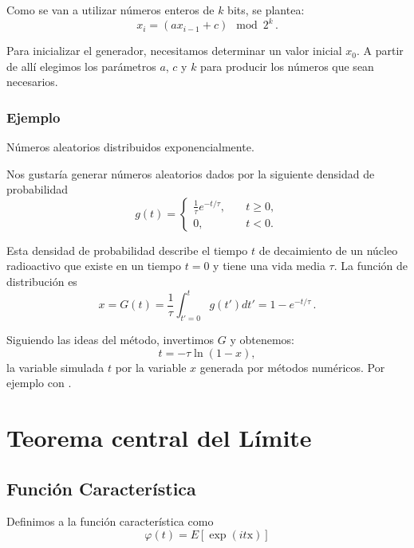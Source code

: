 \documentclass[openany]{book}
\begin{document}
Como se van a utilizar números enteros de $k$ bits, se plantea:
\begin{equation}
  \label{eq:LCG-bin}
  x_{i}=(ax_{i-1}+c)\mod{2^{k}}\,.
\end{equation}

Para inicializar el generador, necesitamos determinar un valor inicial $x_0$. A partir de allí elegimos los parámetros $a$, $c$ y $k$ para producir los números que sean necesarios.

\subsection{Ejemplo}
\textrm{\large{Números aleatorios distribuidos exponencialmente.}}
\vspace{2mm}
\par Nos gustaría generar números aleatorios dados por la siguiente densidad de probabilidad
\begin{equation*}
  g(t)=\begin{cases}
    \frac{1}{\tau}e^{-t/\tau},\quad &t\geq0,\\
    0, \quad &t<0. 
  \end{cases}
\end{equation*}
\par Esta densidad de probabilidad describe el tiempo $t$ de decaimiento de un núcleo radioactivo que existe en un tiempo $t=0$ y tiene una vida media $\tau$. La función de distribución es
\begin{equation*}
  x=G(t)=\frac{1}{\tau}\int_{t'=0}^{t}g(t')dt'=1-e^{-t/\tau}\,.
\end{equation*}
\par Siguiendo las ideas del método, invertimos $G$ y obtenemos:
\begin{equation*}
  t=-\tau\ln{(1-x)},
\end{equation*}
la variable simulada $t$ por la variable $x$ generada por métodos numéricos. Por ejemplo con .

\chapter{Teorema central del Límite}
\section{Función Característica}
Definimos a la función característica como
\begin{equation}
  \label{eq:func-carac-def}
  \varphi(t)=E\left[\exp(it\mathrm{x})\right]
\end{equation}
\end{document}
